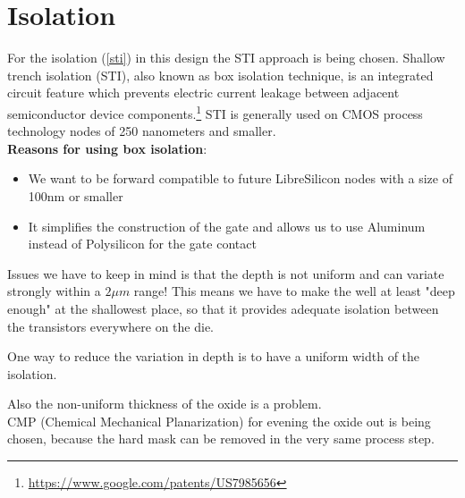 \section{Isolation}
For the isolation (\autoref{sti})  in this design the STI approach is being chosen.
Shallow trench isolation (STI), also known as box isolation technique, is an integrated circuit feature which prevents electric current leakage between adjacent semiconductor device components.\footnote{\url{https://www.google.com/patents/US7985656}}
STI is generally used on CMOS process technology nodes of 250 nanometers and smaller.\\

\textbf{Reasons for using box isolation}:\begin{itemize}
\item We want to be forward compatible to future LibreSilicon nodes with a size of 100nm or smaller
\item It simplifies the construction of the gate and allows us to use Aluminum instead of Polysilicon for the gate contact
\end{itemize}

Issues we have to keep in mind is that the depth is not uniform and can variate strongly within a $2 \mu m$ range!
This means we have to make the well at least "deep enough" at the shallowest place, so that it provides adequate isolation between the transistors everywhere on the die.

One way to reduce the variation in depth is to have a uniform width of the isolation.

Also the non-uniform thickness of the oxide is a problem. \\

CMP (Chemical Mechanical Planarization) for evening the oxide out is being chosen, because the hard mask can be removed in the very same process step.